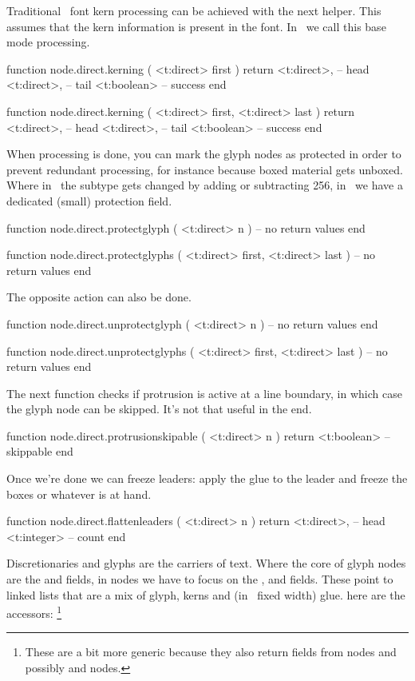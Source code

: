 Traditional \TEX\ font kern processing can be achieved with the next helper. This
assumes that the kern information is present in the font. In \CONTEXT\ we
call this base mode processing.

\starttyping[option=LUA]
function node.direct.kerning ( <t:direct> first )
    return
        <t:direct>, -- head
        <t:direct>, -- tail
        <t:boolean> -- success
end

function node.direct.kerning ( <t:direct> first, <t:direct> last )
    return
        <t:direct>, -- head
        <t:direct>, -- tail
        <t:boolean> -- success
end
\stoptyping

When processing is done, you can mark the glyph nodes as protected in order to
prevent redundant processing, for instance because boxed material gets unboxed.
Where in \LUATEX\ the subtype gets changed by adding or subtracting 256, in
\LUAMETATEX\ we have a dedicated (small) protection field.

\starttyping[option=LUA]
function node.direct.protectglyph ( <t:direct> n )
    -- no return values
end

function node.direct.protectglyphs ( <t:direct> first, <t:direct> last )
    -- no return values
end
\stoptyping

The opposite action can also be done.

\starttyping[option=LUA]
function node.direct.unprotectglyph ( <t:direct> n )
    -- no return values
end

function node.direct.unprotectglyphs ( <t:direct> first, <t:direct> last )
    -- no return values
end
\stoptyping

The next function checks if protrusion is active at a line boundary, in which case the glyph
node can be skipped. It's not that useful in the end.

\starttyping[option=LUA]
function node.direct.protrusionskipable ( <t:direct> n )
    return <t:boolean> -- skippable
end
\stoptyping

Once we're done we can freeze leaders: apply the glue to the leader and freeze
the boxes or whatever is at hand.

\starttyping[option=LUA]
function node.direct.flattenleaders ( <t:direct> n )
    return
        <t:direct>, -- head
        <t:integer> -- count
end
\stoptyping

\stopsubsection

\startsubsection[title=Discretionaries]

Discretionaries and glyphs are the carriers of text. Where the core of \type
{glyph} nodes are the  and  fields, in  nodes
we have to focus on the ,  and  fields.
These point to linked lists that are a mix of glyph, kerns and (in \LUAMETATEX\
fixed width) glue. here are the accessors: \footnote {These are a bit more
generic because they also return fields from \type {choice} nodes and possibly
\type {hlist} and \type {vlist} nodes.}

